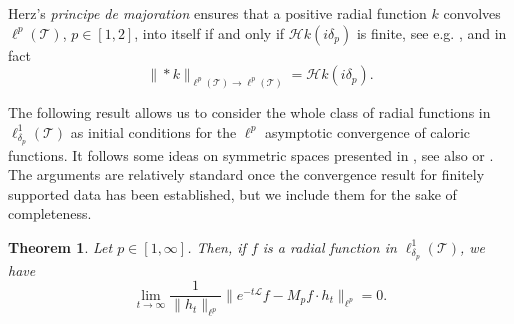 \documentclass[11pt,a4paper,reqno]{amsart}
\renewcommand\mathcal{\mathscr}
\theoremstyle{plain}
\newtheorem{theorem}{Theorem}[section]
\theoremstyle{remark}
\theoremstyle{definition}
\theoremstyle{remark}
\numberwithin{equation}{section}
\begin{document}
Herz’s \textit{principe de majoration} ensures that a positive radial function
$k$ convolves $\ell^p(\mathcal{T})$, $p\in [1,2]$, into itself if and only if $\mathcal{H}k(i\delta_p)$ is finite, see e.g. \cite{VECA}, and in fact $$\|\ast k\|_{\ell^p(\mathcal{T})\to \ell^p(\mathcal{T})}=\mathcal{H}k(i\delta_p).$$

The following result allows us to consider the whole class of radial functions in $\ell^1_{\delta_p}(\mathcal{T})$ as initial conditions for the $\ell^p$ asymptotic convergence of caloric functions. It follows some ideas on symmetric spaces presented in \cite{Naik}, see also \cite{P1} or \cite{PT}. The arguments are relatively standard once the convergence result for finitely supported data has been established, but we include them for the sake of completeness. 
\begin{theorem}
	\label{thm:9}
	Let $p \in [1, \infty]$. Then, if $f$ is a radial function
	in $\ell^1_{\delta_p}(\mathcal{T})$, we have
	\[
	\lim_{t \to \infty} 
	\frac{1}{\|h_t \|_{\ell^p}}
	\big\|e^{-t\mathcal{L}}f-M_pf \cdot h_t\|_{\ell^p} = 0.
	\]
\end{theorem}
\end{document}
